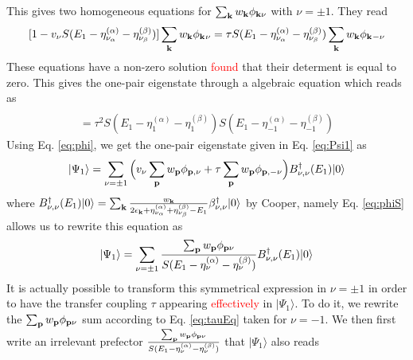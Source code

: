 \documentclass[11pt]{article} %
\newcommand{\ns}[1]{\textcolor{red}{#1}}
\begin{document}
This gives two homogeneous equations for $\sum_{\mathbf{k}}w_{\mathbf{k}}\phi_{\mathbf{k}\nu}$ with $\nu=\pm1$. They read
\begin{equation}\label{eq:tauEq}
[1-v_{\nu}S(E_1-\eta_{\nu_{\alpha}}^{(\alpha)}-\eta_{\nu_{\beta}}^{(\beta)})]\sum_{\mathbf{k}}w_{\mathbf{k}}\phi_{\mathbf{k}^{}\nu}
=\tau{}S(E_1-\eta_{\nu_{\alpha}}^{(\alpha)}-\eta_{\nu_{\beta}}^{(\beta)})\sum_{\mathbf{k}}w_{\mathbf{k}}\phi_{\mathbf{k}^{}-\nu}
\end{equation}
These equations have a non-zero solution \ns{found} that their determent is equal to zero.  This gives the one-pair eigenstate through a algebraic  equation which reads as 
\begin{multline}
[1-v_{1}S(E_1-\eta_{1}^{(\alpha)}-\eta_{1}^{(\beta)})][1-v_{-1}S(E_1-\eta_{-1}^{(\alpha)}-\eta_{-1}^{(\beta)})]\\
=\tau^2S(E_1-\eta_{1}^{(\alpha)}-\eta_{1}^{(\beta)})S(E_1-\eta_{-1}^{(\alpha)}-\eta_{-1}^{(\beta)})
\end{multline}
Using Eq. \ref{eq:phi}, we get the one-pair eigenstate given in Eq. \ref{eq:Psi1} as
\begin{equation}
|\Psi_1\rangle=\sum_{\nu=\pm1}\Big(v_{\nu}\sum_{\mathbf{p}}w_{\mathbf{p}}\phi_{\mathbf{p},\nu}+\tau{}\sum_{\mathbf{p}}w_{\mathbf{p}}\phi_{\mathbf{p},-\nu}\Big)B^{\dagger}_{\nu,\nu}(E_{1})|0\rangle
\end{equation}
where $B^{\dagger}_{\nu,\nu}(E_{1})|0\rangle=\sum_{\mathbf{k}}\frac{w_{\mathbf{k}}}{2\epsilon_{\mathbf{k}}+\eta_{\nu_{\alpha}}^{(\alpha)}+\eta_{\nu_{\beta}}^{(\beta)}-E_1}\beta^{\dagger}_{\nu,\nu}|0\rangle$ by Cooper, namely Eq. \ref{eq:phiS} allows us to rewrite this equation as 
\begin{equation}
|\Psi_1\rangle=\sum_{\nu=\pm1}\frac{\sum_{\mathbf{p}}w_{\mathbf{p}}\phi_{\mathbf{p}\nu}}{S(E_1-\eta_{\nu_{}}^{(\alpha)}-\eta_{\nu_{}}^{(\beta)})}B^{\dagger}_{\nu,\nu}(E_{1})|0\rangle
\end{equation}
It is actually possible to transform this symmetrical expression in $\nu=\pm1$ in order to have the transfer coupling $\tau$ appearing \ns{effectively} in $|\Psi_1\rangle$.  To do it, we rewrite the $\sum_{\mathbf{p}}w_{\mathbf{p}}\phi_{\mathbf{p}\nu}$ sum according to Eq. \ref{eq:tauEq} taken for $\nu=-1$.  We then first write an {irrelevant} prefector $\frac{\sum_{\mathbf{p}}w_{\mathbf{p}}\phi_{\mathbf{p}\nu}}{S(E_1-\eta_{\nu_{}}^{(\alpha)}-\eta_{\nu_{}}^{(\beta)})}$ that $|\Psi_1\rangle$ also reads




\end{document}
